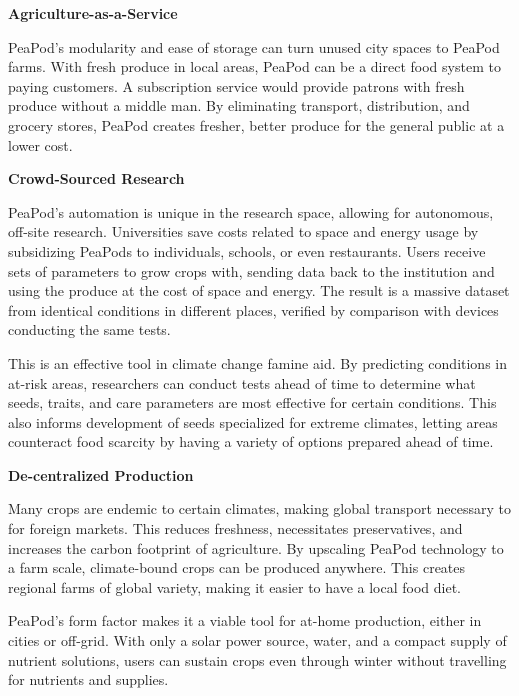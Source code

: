 \documentclass{report}
\begin{document}
\textbf{Agriculture-as-a-Service}

PeaPod’s modularity and ease of storage can turn unused city spaces to PeaPod farms. With fresh produce in local areas, PeaPod can be a direct food system to paying customers. A subscription service would provide patrons with fresh produce without a middle man. By eliminating transport, distribution, and grocery stores, PeaPod creates fresher, better produce for the general public at a lower cost.

\textbf{Crowd-Sourced Research}

PeaPod's automation is unique in the research space, allowing for autonomous, off-site research. Universities save costs related to space and energy usage by subsidizing PeaPods to individuals, schools, or even restaurants. Users receive sets of parameters to grow crops with, sending data back to the institution and using the produce at the cost of space and energy. The result is a massive dataset from identical conditions in different places, verified by comparison with devices conducting the same tests.

This is an effective tool in climate change famine aid. By predicting conditions in at-risk areas, researchers can conduct tests ahead of time to determine what seeds, traits, and care parameters are most effective for certain conditions. This also informs development of seeds specialized for extreme climates, letting areas counteract food scarcity by having a variety of options prepared ahead of time.

\textbf{De-centralized Production}

Many crops are endemic to certain climates, making global transport necessary to for foreign markets. This reduces freshness, necessitates preservatives, and increases the carbon footprint of agriculture. By upscaling PeaPod technology to a farm scale, climate-bound crops can be produced anywhere. This creates regional farms of global variety, making it easier to have a local food diet.

PeaPod's form factor makes it a viable tool for at-home production, either in cities or off-grid. With only a solar power source, water, and a compact supply of nutrient solutions, users can sustain crops even through winter without travelling for nutrients and supplies.


\end{document}

